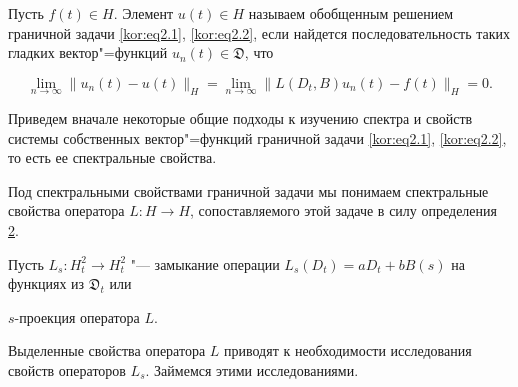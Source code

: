\smallskip



\hypertarget{korn:def:2}{}



\begin{definition}[2]Пусть $f(t)\in H$. Элемент $u(t)\in H$ называем обобщенным решением граничной задачи \eqref{kor:eq2.1}, \eqref{kor:eq2.2}, если найдется последовательность таких гладких вектор"=функций $u_n(t)\in\mathfrak{D}$, что 

$$\lim\limits_{n\to\infty}\|u_n(t)-u(t)\|_H=\lim\limits_{n\to\infty}\|L(D_t,B)u_n(t)-f(t)\|_H=0.$$

\end{definition}





\smallskip



Приведем вначале некоторые общие подходы к изучению спектра и свойств системы собственных вектор"=функций граничной задачи \eqref{kor:eq2.1}, \eqref{kor:eq2.2}, то есть ее спектральные свойства. 

Под спектральными свойствами граничной задачи мы понимаем спектральные свойства оператора $L:H\to H$, сопоставляемого этой задаче в силу определения \hyperlink{korn:def:2}{2}.








Пусть $L_s:H_t^2\to H_t^2$ "--- замыкание операции $L_s(D_t)=aD_t+bB(s)$ на функциях из $\mathfrak{D}_t$ или 

 $s$-проекция оператора $L$.



Выделенные свойства оператора $L$ приводят к необходимости исследования свойств операторов $L_s$. Займемся этими исследованиями.



\smallskip





